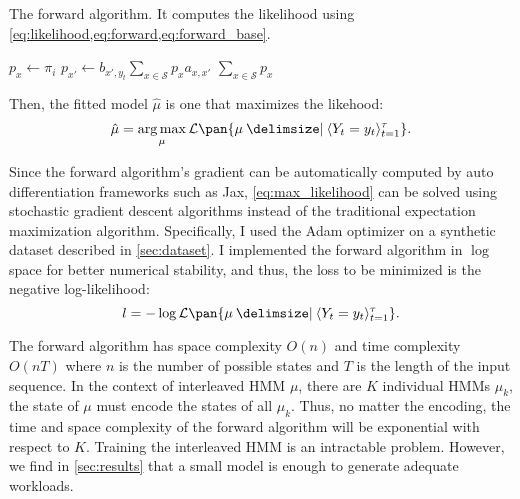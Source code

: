 \begin{algorithm}
    \caption{The forward algorithm. It computes the likelihood using \cref{eq:likelihood,eq:forward,eq:forward_base}.}\label{alg:forward}
    \begin{algorithmic}[1]
                \State $p_x \gets \pi_i$
            \EndFor
                    \State $p_{x'} \gets b_{x',y_t} \sum_{x \in \mathcal{S}} p_x a_{x, x'}$
                \EndFor
            \EndFor
            \State \Return $\sum_{x \in \mathcal{S}} p_x$
        \EndProcedure
    \end{algorithmic}
\end{algorithm}

Then, the fitted model \(\hat{\mu}\) is one that maximizes the likehood:
\begin{equation}
    \label{eq:max_likelihood}
    \hat{\mu} = \argmax_{\mu} \mathcal{L}\pan{\mu \giv \seq{Y_t = y_t}_{t=1}^\tau}.
\end{equation}

Since the forward algorithm's gradient can be automatically computed by auto differentiation frameworks such as Jax\cite{Bradbury2018-jz}, \cref{eq:max_likelihood} can be solved using stochastic gradient descent algorithms instead of the traditional expectation maximization algorithm\cite{Minot2014-gn}. Specifically, I used the Adam\cite{Kingma2014-jj} optimizer on a synthetic dataset described in \cref{sec:dataset}. I implemented the forward algorithm in \(\log\) space for better numerical stability, and thus, the loss to be minimized is the negative log-likelihood:
\begin{equation}
    \label{eq:neg_log_likelihood}
    l = - \log \mathcal{L}\pan{\mu \giv \seq{Y_t = y_t}_{t=1}^\tau}.
\end{equation}

The forward algorithm has space complexity \(O(n)\)  and time complexity \(O(nT)\) where \(n\) is the number of possible states and \(T\) is the length of the input sequence. In the context of interleaved HMM \(\mu\), there are \(K\) individual HMMs \(\mu_k\), the state of \(\mu\) must encode the states of all \(\mu_k\). Thus, no matter the encoding, the time and space complexity of the forward algorithm will be exponential with respect to \(K\). Training the interleaved HMM is an intractable problem\cite{Landwehr2008-vw}. However, we find in \cref{sec:results} that a small model is enough to generate adequate workloads.

